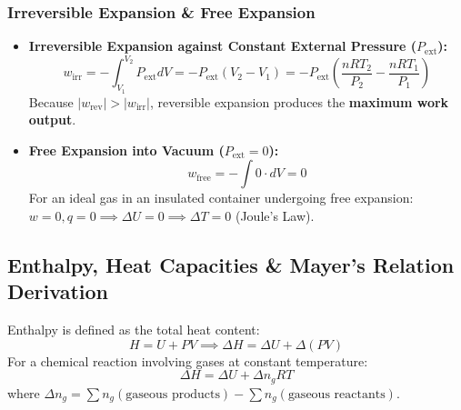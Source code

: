 \documentclass[10pt,a4paper]{article}
\begin{document}
\subsubsection{Irreversible Expansion \& Free Expansion}
\begin{itemize}
  \item \textbf{Irreversible Expansion against Constant External Pressure ($P_{\text{ext}}$):}
  \begin{equation}
    w_{\text{irr}} = -\int_{V_1}^{V_2} P_{\text{ext}} dV = -P_{\text{ext}}(V_2 - V_1) = -P_{\text{ext}}\left(\frac{n R T_2}{P_2} - \frac{n R T_1}{P_1}\right)
  \end{equation}
  Because $|w_{\text{rev}}| > |w_{\text{irr}}|$, reversible expansion produces the \textbf{maximum work output}.
  \item \textbf{Free Expansion into Vacuum ($P_{\text{ext}} = 0$):}
  \begin{equation}
    w_{\text{free}} = -\int 0 \cdot dV = 0
  \end{equation}
  For an ideal gas in an insulated container undergoing free expansion: $w = 0, q = 0 \implies \Delta U = 0 \implies \Delta T = 0$ (Joule's Law).
\end{itemize}

\subsection{Enthalpy, Heat Capacities \& Mayer's Relation Derivation}
Enthalpy is defined as the total heat content:
\begin{equation}
  H = U + P V \implies \Delta H = \Delta U + \Delta(P V)
\end{equation}
For a chemical reaction involving gases at constant temperature:
\begin{equation}
  \Delta H = \Delta U + \Delta n_g R T
\end{equation}
where $\Delta n_g = \sum n_g(\text{gaseous products}) - \sum n_g(\text{gaseous reactants})$.
\end{document}
